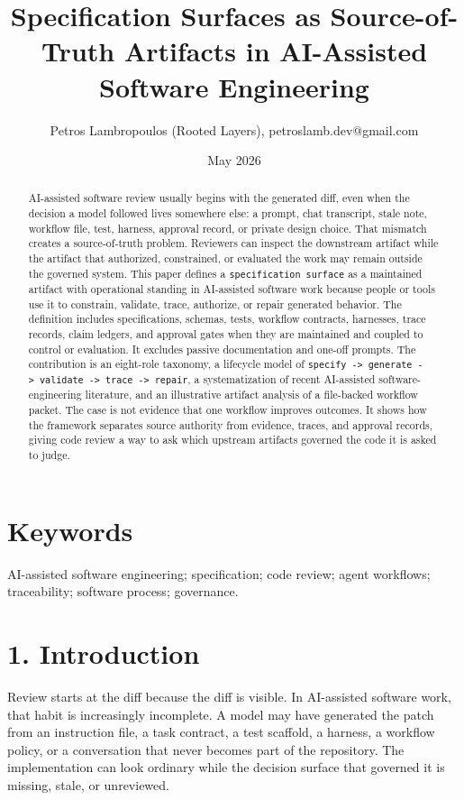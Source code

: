 \documentclass[
]{article}
\title{Specification Surfaces as Source-of-Truth Artifacts in
AI-Assisted Software Engineering}
\author{Petros Lambropoulos (Rooted Layers), petroslamb.dev@gmail.com}
\date{May 2026}
\begin{document}
\maketitle
\begin{abstract}
AI-assisted software review usually begins with the generated diff, even
when the decision a model followed lives somewhere else: a prompt, chat
transcript, stale note, workflow file, test, harness, approval record,
or private design choice. That mismatch creates a source-of-truth
problem. Reviewers can inspect the downstream artifact while the
artifact that authorized, constrained, or evaluated the work may remain
outside the governed system. This paper defines a
\texttt{specification\ surface} as a maintained artifact with
operational standing in AI-assisted software work because people or
tools use it to constrain, validate, trace, authorize, or repair
generated behavior. The definition includes specifications, schemas,
tests, workflow contracts, harnesses, trace records, claim ledgers, and
approval gates when they are maintained and coupled to control or
evaluation. It excludes passive documentation and one-off prompts. The
contribution is an eight-role taxonomy, a lifecycle model of
\texttt{specify\ -\textgreater{}\ generate\ -\textgreater{}\ validate\ -\textgreater{}\ trace\ -\textgreater{}\ repair},
a systematization of recent AI-assisted software-engineering literature,
and an illustrative artifact analysis of a file-backed workflow packet.
The case is not evidence that one workflow improves outcomes. It shows
how the framework separates source authority from evidence, traces, and
approval records, giving code review a way to ask which upstream
artifacts governed the code it is asked to judge.
\end{abstract}

\section{Keywords}\label{keywords}

AI-assisted software engineering; specification; code review; agent
workflows; traceability; software process; governance.

\section{1. Introduction}\label{introduction}

Review starts at the diff because the diff is visible. In AI-assisted
software work, that habit is increasingly incomplete. A model may have
generated the patch from an instruction file, a task contract, a test
scaffold, a harness, a workflow policy, or a conversation that never
becomes part of the repository. The implementation can look ordinary
while the decision surface that governed it is missing, stale, or
unreviewed.
\end{document}
